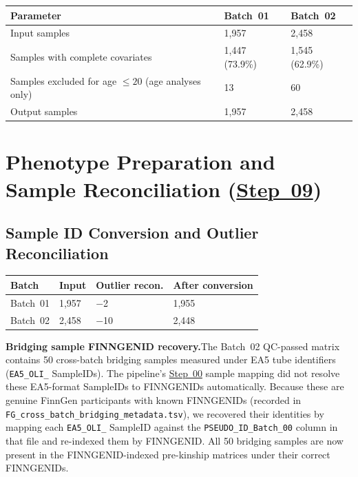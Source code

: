 \documentclass[11pt,a4paper]{article}
\begin{document}
{\footnotesize
\renewcommand{\arraystretch}{1.2}
\begin{longtable}{p{6cm}p{3cm}p{3cm}}
\toprule
\textbf{Parameter} & \textbf{Batch~01} & \textbf{Batch~02} \\
\midrule
Input samples & 1,957 & 2,458 \\
Samples with complete covariates & 1,447 (73.9\%) & 1,545 (62.9\%) \\
Samples excluded for age $\leq 20$ (age analyses only) & 13 & 60 \\
Output samples & 1,957 & 2,458 \\
\bottomrule
\end{longtable}
\renewcommand{\arraystretch}{1.0}
}


\section{Phenotype Preparation and Sample Reconciliation (\href{https://github.com/FINNGEN/FinnGen3-proteomics-pipeline#pipeline-steps}{Step~09})}

\subsection{Sample ID Conversion and Outlier Reconciliation}

{\footnotesize
\renewcommand{\arraystretch}{1.2}
\begin{longtable}{p{2.5cm}p{2cm}p{2.5cm}p{3cm}}
\toprule
\textbf{Batch} & \textbf{Input} & \textbf{Outlier recon.}
  & \textbf{After conversion} \\
\midrule
Batch~01 & 1,957 & $-$2  & 1,955 \\
Batch~02 & 2,458 & $-$10 & 2,448 \\
\bottomrule
\end{longtable}
\renewcommand{\arraystretch}{1.0}
}

\textbf{Bridging sample FINNGENID recovery.}\enspace The Batch~02 QC-passed
matrix contains 50 cross-batch bridging samples measured under EA5 tube
identifiers (\texttt{EA5\_OLI\_} SampleIDs). The pipeline's \href{https://github.com/FINNGEN/FinnGen3-proteomics-pipeline#pipeline-steps}{Step~00} sample
mapping did not resolve these EA5-format SampleIDs to FINNGENIDs
automatically. Because these are genuine FinnGen participants with known
FINNGENIDs (recorded in
\texttt{FG\_cross\_batch\_bridging\_metadata.tsv}), we recovered their
identities by mapping each \texttt{EA5\_OLI\_} SampleID against the
\texttt{PSEUDO\_ID\_Batch\_00} column in that file and re-indexed them by
FINNGENID. All 50 bridging samples are now present in the FINNGENID-indexed
pre-kinship matrices under their correct FINNGENIDs.
\end{document}
